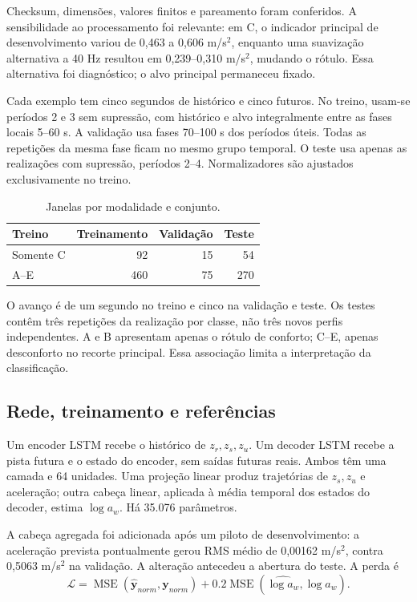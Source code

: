 \documentclass[conference]{IEEEtran}
\begin{document}
Checksum, dimensões, valores finitos e pareamento foram conferidos. A sensibilidade ao processamento foi relevante: em C, o indicador principal de desenvolvimento variou de 0,463 a 0,606 m/s$^2$, enquanto uma suavização alternativa a 40 Hz resultou em 0,239--0,310 m/s$^2$, mudando o rótulo. Essa alternativa foi diagnóstico; o alvo principal permaneceu fixado.

Cada exemplo tem cinco segundos de histórico e cinco futuros. No treino, usam-se períodos 2 e 3 sem supressão, com histórico e alvo integralmente entre as fases locais 5--60 s. A validação usa fases 70--100 s dos períodos úteis. Todas as repetições da mesma fase ficam no mesmo grupo temporal. O teste usa apenas as realizações com supressão, períodos 2--4. Normalizadores são ajustados exclusivamente no treino.

\begin{table}[t]
\caption{Janelas por modalidade e conjunto.}
\centering
\begin{tabular}{lrrr}\toprule
Treino & Treinamento & Validação & Teste\\\midrule
Somente C & 92 & 15 & 54\\
A--E & 460 & 75 & 270\\\bottomrule
\end{tabular}
\end{table}

O avanço é de um segundo no treino e cinco na validação e teste. Os testes contêm três repetições da realização por classe, não três novos perfis independentes. A e B apresentam apenas o rótulo de conforto; C--E, apenas desconforto no recorte principal. Essa associação limita a interpretação da classificação.

\subsection{Rede, treinamento e referências}
Um encoder LSTM recebe o histórico de $z_r,z_s,z_u$. Um decoder LSTM recebe a pista futura e o estado do encoder, sem saídas futuras reais. Ambos têm uma camada e 64 unidades. Uma projeção linear produz trajetórias de $z_s,z_u$ e aceleração; outra cabeça linear, aplicada à média temporal dos estados do decoder, estima $\log a_w$. Há 35.076 parâmetros.

A cabeça agregada foi adicionada após um piloto de desenvolvimento: a aceleração prevista pontualmente gerou RMS médio de 0,00162 m/s$^2$, contra 0,5063 m/s$^2$ na validação. A alteração antecedeu a abertura do teste. A perda é
\begin{equation}
\mathcal L=\operatorname{MSE}(\hat{\boldsymbol y}_{norm},\boldsymbol y_{norm})+
0.2\operatorname{MSE}(\widehat{\log a_w},\log a_w).
\end{equation}
\end{document}
